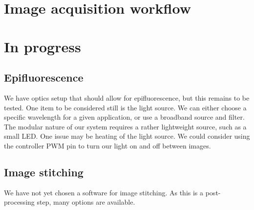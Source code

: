 \documentclass{article}
\begin{document}
\section{Image acquisition workflow}

\section{In progress}
\subsection{Epifluorescence}
We have optics setup that should allow for epifluorescence, but this remains to be tested.
One item to be considered still is the light source.
We can either choose a specific wavelength for a given application, or use a broadband source and filter.
The modular nature of our system requires a rather lightweight source, such as a small LED. One issue may be heating of the light source.
We could consider using the controller PWM pin to turn our light on and off between images.
\subsection{Image stitching}
We have not yet chosen a software for image stitching.
As this is a post-processing step, many options are available.
\end{document}
